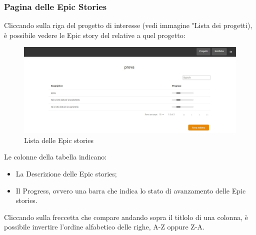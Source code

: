 \documentclass{article}
\begin{document}
\subsubsection{Pagina delle Epic Stories}
Cliccando sulla riga del progetto di interesse (vedi immagine "Lista dei progetti), è possibile vedere le Epic story del relative a quel progetto:
    \begin{figure}[H]
      \centering
      \includegraphics[width=\textwidth]{documenti/Screenshot manuale utente/epic dev.jpeg}
      \caption{Lista delle Epic stories}
      \label{listaepic}
    \end{figure} 
Le colonne della tabella indicano:
\begin{itemize}
    \item La Descrizione delle Epic stories;
    \item Il Progress, ovvero una barra che indica lo stato di avanzamento delle Epic stories.
\end{itemize}
Cliccando sulla freccetta che compare andando sopra il titlolo di una colonna, è possibile invertire l'ordine alfabetico delle righe, A-Z oppure Z-A.
\end{document}
